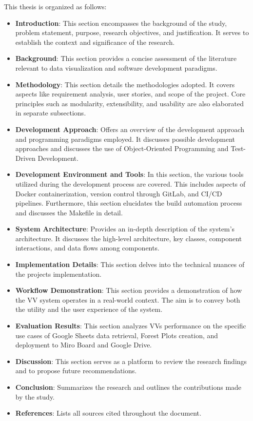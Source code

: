 This thesis is organized as follows:

\begin{itemize}
\item
  \textbf{Introduction}: This section encompasses the background of the
  study, problem statement, purpose, research objectives, and
  justification. It serves to establish the context and significance of
  the research.
\item
  \textbf{Background}: This section provides a concise assessment of the
  literature relevant to data visualization and software development paradigms.
\item
  \textbf{Methodology}: This section details the methodologies adopted.
  It covers aspects like requirement analysis, user stories, and scope
  of the project. Core principles such as modularity, extensibility, and
  usability are also elaborated in separate subsections.
\item
  \textbf{Development Approach}: Offers an overview of the development
  approach and programming paradigms employed. It discusses possible
  development approaches and discusses the use of Object-Oriented
  Programming and Test-Driven Development.
\item
  \textbf{Development Environment and Tools}: In this section, the
  various tools utilized during the development process are covered. This includes aspects of Docker containerization, version
  control through GitLab, and CI/CD pipelines. Furthermore, this section
  elucidates the build automation process and discusses the Makefile in
  detail.
\item
  \textbf{System Architecture}: Provides an in-depth description of the
  system's architecture. It discusses the high-level architecture, key
  classes, component interactions, and data flows among components.
\item
  \textbf{Implementation Details}: This section delves into the
  technical nuances of the project\textquotesingle s implementation.
\item
  \textbf{Workflow Demonstration}: This section provides a demonstration
  of how the VV system operates in a real-world context. The aim is to
  convey both the utility and the user experience of the system.
\item
  \textbf{Evaluation Results}: This section analyzes
  VV\textquotesingle s performance on the specific use cases of Google
  Sheets data retrieval, Forest Plots creation, and deployment to Miro
  Board and Google Drive.
\item
  \textbf{Discussion}: This section serves as a platform to review the
  research findings and to propose future recommendations.
\item
  \textbf{Conclusion}: Summarizes the research and outlines the
  contributions made by the study.
\item
  \textbf{References}: Lists all sources cited throughout the document.
\end{itemize}
